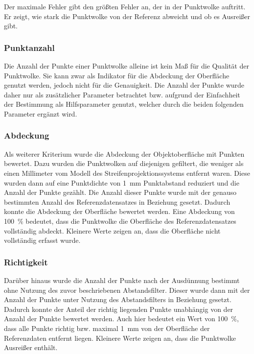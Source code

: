 \documentclass[./00PhotoBox.tex]{subfiles}
\begin{document}
Der maximale Fehler gibt den größten Fehler an, der in der Punktwolke auftritt. Er zeigt, wie stark die Punktwolke von der Referenz abweicht und ob es Ausreißer gibt.



\subsubsection{Punktanzahl}
Die Anzahl der Punkte einer Punktwolke alleine ist kein Maß für die Qualität der Punktwolke. Sie kann zwar als Indikator für die Abdeckung der Oberfläche genutzt werden, jedoch nicht für die Genauigkeit. Die Anzahl der Punkte wurde daher nur als zusätzlicher Parameter betrachtet bzw. aufgrund der Einfachheit der Bestimmung als Hilfsparameter genutzt, welcher durch die beiden folgenden Parameter ergänzt wird.

\subsubsection{Abdeckung}
Als weiterer Kriterium wurde die Abdeckung der Objektoberfläche mit Punkten bewertet. Dazu wurden die Punktwolken auf diejenigen gefiltert, die weniger als einen Millimeter vom Modell des Streifenprojektionssystems entfernt waren. Diese wurden dann auf eine Punktdichte von \SI{1}{\milli\metre} Punktabstand reduziert und die Anzahl der Punkte gezählt. Die Anzahl dieser Punkte wurde mit der genauso bestimmten Anzahl des Referenzdatensatzes in Beziehung gesetzt. Dadurch konnte die Abdeckung der Oberfläche bewertet werden. Eine Abdeckung von \SI{100}{\percent} bedeutet, dass die Punktwolke die Oberfläche des Referenzdatensatzes vollständig abdeckt. Kleinere Werte zeigen an, dass die Oberfläche nicht vollständig erfasst wurde.

\subsubsection{Richtigkeit}
Darüber hinaus wurde die Anzahl der Punkte nach der Ausdünnung bestimmt ohne Nutzung des zuvor beschriebenen Abstandsfilter. Dieser wurde dann mit der Anzahl der Punkte unter Nutzung des Abstandsfilters in Beziehung gesetzt. Dadurch konnte der Anteil der richtig liegenden Punkte unabhängig von der Anzahl der Punkte bewertet werden. Auch hier bedeutet ein Wert von \SI{100}{\percent}, dass alle Punkte richtig bzw. maximal \SI{1}{\milli\metre} von der Oberfläche der Referenzdaten entfernt liegen. Kleinere Werte zeigen an, dass die Punktwolke Ausreißer enthält.
\end{document}
